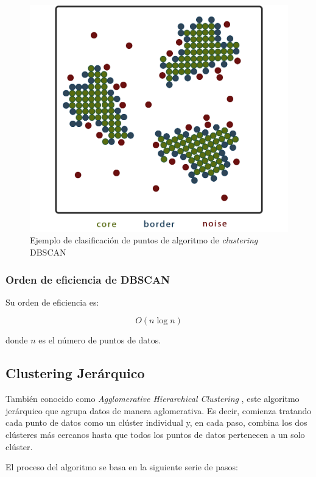 \vspace{-2mm}

\begin{figure}[H]
    \centering
    \includegraphics[width=0.725\linewidth]{imagenes/dbscan-points.png}
    \caption{Ejemplo de clasificación de puntos de algoritmo de \textit{clustering} \gls{DBSCAN}}
    \label{fig:puntos-dbscan}
\end{figure}

\subsubsection*{Orden de eficiencia de \gls{DBSCAN}}

Su orden de eficiencia es:

\vspace{-0.2cm}

\begin{equation}
    O(n \log n)
\end{equation}

donde \( n \) es el número de puntos de datos.

\subsection{Clustering Jerárquico} %
\label{AHC}
También conocido como \textit{Agglomerative Hierarchical Clustering} \cite{Aggarwal2013}, este algoritmo jerárquico que agrupa datos de manera aglomerativa. Es decir, comienza tratando cada punto de datos como un clúster individual y, en cada paso, combina los dos clústeres más cercanos hasta que todos los puntos de datos pertenecen a un solo clúster.

El proceso del algoritmo se basa en la siguiente serie de pasos:

